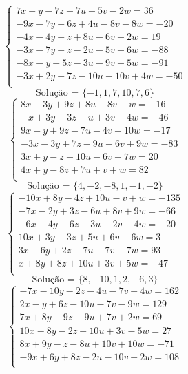 \documentclass[12pt,oneside,a4paper]{article}
\begin{document}
\vspace{\baselineskip}
\begin{equation*}
\begin{cases}
7x-y-7z+7u+5v-2w=36 \\
-9x-7y+6z+4u-8v-8w=-20 \\
-4x-4y-z+8u-6v-2w=19 \\
-3x-7y+z-2u-5v-6w=-88 \\
-8x-y-5z-3u-9v+5w=-91 \\
-3x+2y-7z-10u+10v+4w=-50 \\
\end{cases}
\end{equation*}
\begin{equation*}
\text{Solução = }\{-1,1,7,10,7,6\}
\end{equation*}
\vspace{\baselineskip}
\begin{equation*}
\begin{cases}
8x-3y+9z+8u-8v-w=-16 \\
-x+3y+3z-u+3v+4w=-46 \\
9x-y+9z-7u-4v-10w=-17 \\
-3x-3y+7z-9u-6v+9w=-83 \\
3x+y-z+10u-6v+7w=20 \\
4x+y-8z+7u+v+w=82 \\
\end{cases}
\end{equation*}
\begin{equation*}
\text{Solução = }\{4,-2,-8,1,-1,-2\}
\end{equation*}
\vspace{\baselineskip}
\begin{equation*}
\begin{cases}
-10x+8y-4z+10u-v+w=-135 \\
-7x-2y+3z-6u+8v+9w=-66 \\
-6x-4y-6z-3u-2v-4w=-20 \\
10x+3y-3z+5u+6v-6w=3 \\
3x-6y+2z-7u-7v-7w=93 \\
x+8y+8z+10u+3v+5w=-47 \\
\end{cases}
\end{equation*}
\begin{equation*}
\text{Solução = }\{8,-10,1,2,-6,3\}
\end{equation*}
\vspace{\baselineskip}
\begin{equation*}
\begin{cases}
-7x-10y-2z-4u-7v-4w=162 \\
2x-y+6z-10u-7v-9w=129 \\
7x+8y-9z-9u+7v+2w=69 \\
10x-8y-2z-10u+3v-5w=27 \\
8x+9y-z-8u+10v+10w=-71 \\
-9x+6y+8z-2u-10v+2w=108 \\
\end{cases}
\end{equation*}
\end{document}
